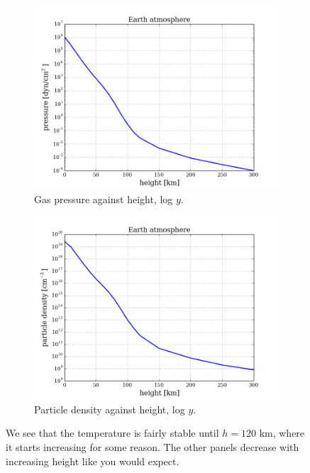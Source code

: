 \documentclass{article}
\begin{document}
\begin{figure}[H]
\begin{subfigure}{0.49\textwidth}
    \includegraphics[scale=0.37]{../figures/earth/earth_h_P.png}
    \caption{Gas pressure against height, log $y$.}
  \end{subfigure}
  \begin{subfigure}{0.49\textwidth}
    \includegraphics[scale=0.37]{../figures/earth/earth_h_N.png}
    \caption{Particle density against height, log $y$.}
  \end{subfigure}
  \caption{We see that the temperature is fairly stable until $h=120$ km, where it starts increasing for some reason. The other panels decrease with increasing height like you would expect.}
\end{figure}
\end{document}
